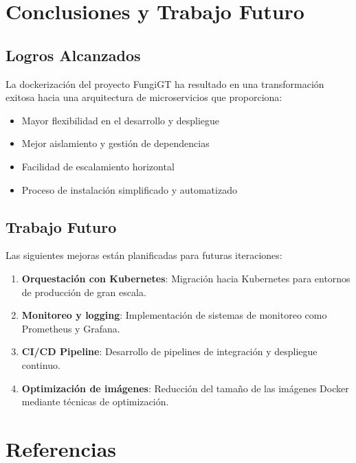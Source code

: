 \documentclass[12pt,a4paper]{article}
\begin{document}
\section{Conclusiones y Trabajo Futuro}

\subsection{Logros Alcanzados}

La dockerización del proyecto FungiGT ha resultado en una transformación exitosa hacia una arquitectura de microservicios que proporciona:

\begin{itemize}
    \item Mayor flexibilidad en el desarrollo y despliegue
    \item Mejor aislamiento y gestión de dependencias
    \item Facilidad de escalamiento horizontal
    \item Proceso de instalación simplificado y automatizado
\end{itemize}

\subsection{Trabajo Futuro}

Las siguientes mejoras están planificadas para futuras iteraciones:

\begin{enumerate}
    \item \textbf{Orquestación con Kubernetes}: Migración hacia Kubernetes para entornos de producción de gran escala.
    
    \item \textbf{Monitoreo y logging}: Implementación de sistemas de monitoreo como Prometheus y Grafana.
    
    \item \textbf{CI/CD Pipeline}: Desarrollo de pipelines de integración y despliegue continuo.
    
    \item \textbf{Optimización de imágenes}: Reducción del tamaño de las imágenes Docker mediante técnicas de optimización.
\end{enumerate}

\section{Referencias}
\end{document}
